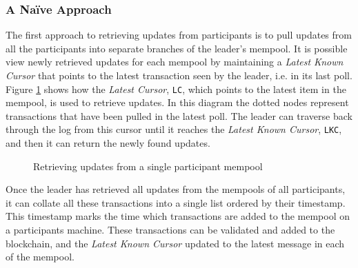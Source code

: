 \documentclass[12pt,a4paper,twoside,openright]{report}
\begin{document}
	\subsubsection*{A Na\"{i}ve Approach}
	The first approach to retrieving updates from participants is to pull updates from all the participants into separate branches of the leader's mempool.
	It is possible view newly retrieved updates for each mempool by maintaining a \textit{Latest Known Cursor} that points to the latest transaction seen by the leader, i.e. in its last poll.
	Figure \ref{fig:readmemudpates} shows how the \textit{Latest Cursor}, \texttt{LC}, which points to the latest item in the mempool, is used to retrieve updates.
	In this diagram the dotted nodes represent transactions that have been pulled in the latest poll.
	The leader can traverse back through the log from this cursor until it reaches the \textit{Latest Known Cursor}, \texttt{LKC}, and then it can return the newly found updates.
	\begin{figure}
		\centering
		\caption{Retrieving updates from a single participant mempool}
		\label{fig:readmemudpates}
	\end{figure}
	Once the leader has retrieved all updates from the mempools of all participants, it can collate all these transactions into a single list ordered by their timestamp.
	This timestamp marks the time which transactions are added to the mempool on a participants machine.
	These transactions can be validated and added to the blockchain, and the \textit{Latest Known Cursor} updated to the latest message in each of the mempool.\\
\end{document}
